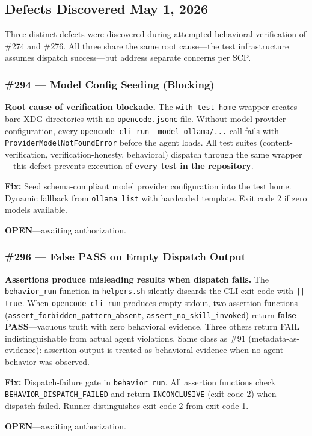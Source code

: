 \documentclass[11pt,a4paper]{article}
\begin{document}
\subsection{Defects Discovered May 1, 2026}

Three distinct defects were discovered during attempted behavioral verification of \#274 and \#276.  All three share the same root cause---the test infrastructure assumes dispatch success---but address separate concerns per SCP.

\subsubsection{\#294 — Model Config Seeding (Blocking)}

\begin{gapbox}
\textbf{Root cause of verification blockade.}  The \texttt{with-test-home} wrapper creates bare XDG directories with no \texttt{opencode.jsonc} file.  Without model provider configuration, every \texttt{opencode-cli run --model ollama/...} call fails with \texttt{ProviderModelNotFoundError} before the agent loads.  All test suites (content-verification, verification-honesty, behavioral) dispatch through the same wrapper---this defect prevents execution of \textbf{every test in the repository}.

\textbf{Fix:} Seed schema-compliant model provider configuration into the test home.  Dynamic fallback from \texttt{ollama list} with hardcoded template.  Exit code 2 if zero models available.

\textbf{OPEN}---awaiting authorization.
\end{gapbox}

\subsubsection{\#296 — False PASS on Empty Dispatch Output}

\begin{gapbox}
\textbf{Assertions produce misleading results when dispatch fails.}  The \texttt{behavior\_run} function in \texttt{helpers.sh} silently discards the CLI exit code with \texttt{|| true}.  When \texttt{opencode-cli run} produces empty stdout, two assertion functions (\texttt{assert\_forbidden\_pattern\_absent}, \texttt{assert\_no\_skill\_invoked}) return \textbf{false PASS}---vacuous truth with zero behavioral evidence.  Three others return FAIL indistinguishable from actual agent violations.  Same class as \#91 (metadata-as-evidence): assertion output is treated as behavioral evidence when no agent behavior was observed.

\textbf{Fix:} Dispatch-failure gate in \texttt{behavior\_run}.  All assertion functions check \texttt{BEHAVIOR\_DISPATCH\_FAILED} and return \texttt{INCONCLUSIVE} (exit code 2) when dispatch failed.  Runner distinguishes exit code 2 from exit code 1.

\textbf{OPEN}---awaiting authorization.
\end{gapbox}
\end{document}
